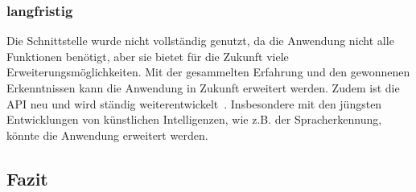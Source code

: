 \subsubsection{langfristig}\label{subsubsec:langfristig}
Die Schnittstelle wurde nicht vollständig genutzt, da die Anwendung nicht alle Funktionen benötigt, aber sie bietet für die Zukunft viele Erweiterungsmöglichkeiten.
Mit der gesammelten Erfahrung und den gewonnenen Erkenntnissen kann die Anwendung in Zukunft erweitert werden.
Zudem ist die API neu und wird ständig weiterentwickelt~\cite{microsoft-graph-api-version}.
Insbesondere mit den jüngsten Entwicklungen von künstlichen Intelligenzen, wie z.B. der Spracherkennung, könnte die Anwendung erweitert werden.

\subsection{Fazit}\label{subsec:fazit}
%
